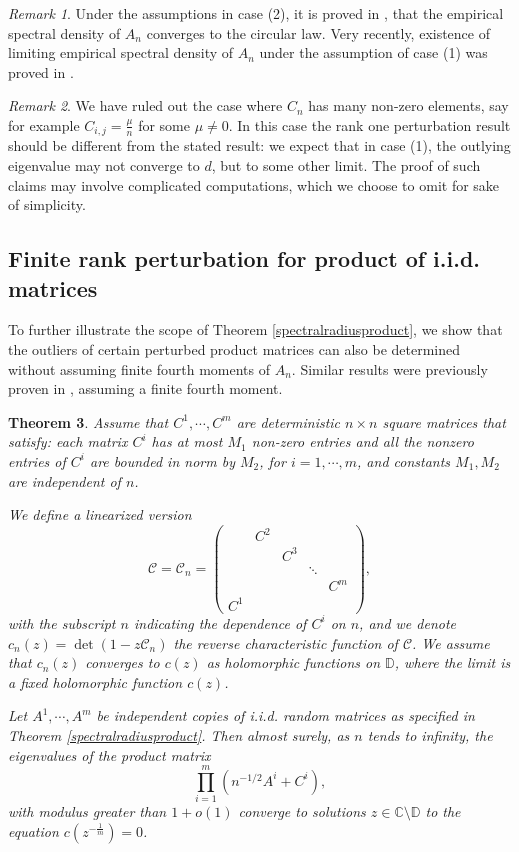 \documentclass[12pt, reqno]{amsart}
\newtheorem{theorem}{Theorem}[section]
\theoremstyle{definition}
\theoremstyle{remark}
\newtheorem{remark}[theorem]{Remark}
\numberwithin{equation}{section}
\begin{document}
\begin{remark}
    Under the assumptions in case (2), it is proved in \cite{basak2019circular}, \cite{rudelson2019sparse} that the empirical spectral density of $A_n$ converges to the circular law. Very recently, existence of limiting empirical spectral density of $A_n$ under the assumption of case (1) was proved in \cite{sah2023limiting}.
\end{remark}



\begin{remark}
We have ruled out the case where $C_n$ has many non-zero elements, say for example $C_{i,j}=\frac{\mu}{n}$ for some $\mu\neq 0$.  In this case the rank one perturbation result should be different from the stated result: we expect that in case (1), the outlying eigenvalue may not converge to $d$, but to some other limit. The proof of such claims may involve complicated computations, which we choose to omit for sake of simplicity.
\end{remark}


\subsection{Finite rank perturbation for product of i.i.d. matrices}
To further illustrate the scope of Theorem \ref{spectralradiusproduct}, we show that the outliers of certain perturbed product matrices can also be determined without assuming finite fourth moments of $A_n$. Similar results were previously proven in \cite{MR4076784}, assuming a finite fourth moment. 


\begin{theorem}\label{productoftheorem1} Assume that $C^1,\cdots,C^m$ are deterministic $n\times n$ square matrices that satisfy:
 each matrix $C^i$ has at most $M_1$ non-zero entries and all the nonzero entries of $C^i$ are bounded in norm by $M_2$, for $i=1,\cdots,m$, and constants $M_1,M_2$ are independent of $n$. 

We define a linearized version 
\begin{equation}
\mathcal{C}=\mathcal{C}_n=\begin{pmatrix}
&C^2&&&\\&&C^3&&\\&&&\ddots&\\&&&&C^m\\C^1&&&&
\end{pmatrix},\end{equation}
with the subscript $n$ indicating the dependence of $C^i$ on $n$, and we denote $c_n(z)=\det(1-z\mathcal{C}_n)$ the reverse characteristic function of $\mathcal{C}$. We assume that $c_n(z)$ converges to $c(z)$ as holomorphic functions on $\mathbb{D}$, where the limit is a fixed holomorphic function $c(z)$.


Let $A^1,\cdots,A^m$ be independent copies of i.i.d. random matrices as specified in Theorem \ref{spectralradiusproduct}. 
Then almost surely, as $n$ tends to infinity, the eigenvalues of the product matrix $$\prod_{i=1}^m(n^{-1/2}A^i+C^i),$$ with modulus greater than $1+o(1)$ converge to solutions $z\in\mathbb{C}\setminus\mathbb{D}$ to the equation $c(z^{-\frac{1}{m}})=0$.
\end{theorem}
\end{document}

